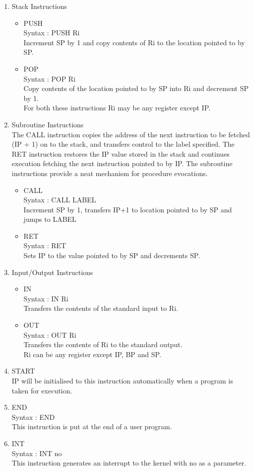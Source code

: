 \documentclass[11pt]{article}
\begin{document}
\begin{enumerate}
\item Stack Instructions
\begin{itemize}
\item PUSH\\
Syntax : PUSH Ri\\
Increment SP by 1 and copy contents of Ri to the location pointed to by SP.
\item POP\\
Syntax : POP Ri\\
Copy contents of the location pointed to by SP into Ri and decrement SP by 1.\\
For both these instructions Ri may be any register except IP.
\end{itemize}

\item Subroutine Instructions\\
The CALL instruction copies the address of the next instruction to be fetched (IP + 1) on to the stack, and transfers control to the label specified. The RET instruction restores the IP value stored in the stack and continues execution fetching the next instruction pointed to by IP. The subroutine instructions provide a neat mechanism for procedure evocations.
\begin{itemize}
\item CALL\\
Syntax : CALL LABEL\\
Increment SP by 1, transfers IP+1 to location pointed to by SP and jumps to LABEL
\item RET\\
Syntax : RET\\
Sets IP to the value pointed to by SP and decrements SP.
\end{itemize}

\item Input/Output Instructions
\begin{itemize}
\item IN\\
Syntax : IN Ri\\
Transfers the contents of the standard input to Ri.
\item OUT\\
Syntax : OUT Ri\\
Transfers the contents of Ri to the standard output.\\
Ri can be any register except IP, BP and SP.
\end{itemize}

\item START\\
IP will be initialised to this instruction automatically when a program is taken for execution.
\item END\\
Syntax : END\\
This instruction is put at the end of a user program.
\item INT\\
Syntax : INT no\\
This instruction generates an interrupt to the kernel with no as a parameter.
\end{enumerate}
\end{document}

